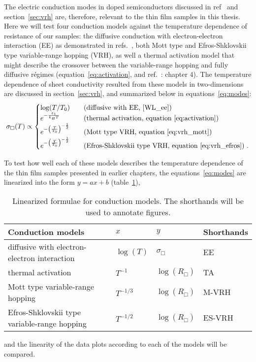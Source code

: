 The electric conduction modes in doped semiconductors discussed in ref~\cite{schklovskii_efros} and section~\ref{sec:vrh} are, therefore, relevant to the thin film samples in this thesis. Here we will test four conduction models against the temperature dependence of resistance of our samples: the diffusive conduction with electron-electron interaction (EE) as demonstrated in refs.~\cite{Chen2011, Liu2011, Roy2013, liao2015}, both Mott type and Efros-Shklovskii type variable-range hopping (VRH), as well a thermal activation model that might describe the crossover between the variable-range hopping and fully diffusive r\'egimes (equation~\ref{eq:activation}, and ref.~\cite{schklovskii_efros}: chapter 4). The temperature dependence of sheet conductivity resulted from these models in two-dimensions are discussed in section~\ref{sec:vrh}, and summarized below in equations~\ref{eq:modes}:%
\begin{equation}\label{eq:modes}
    \sigma_\Box(T) \propto %
    \begin{cases}
        \log(T / T_0)  & \quad \text{(diffusive with EE, \cite{WL_ee})}\\
        e^{-\frac{\varepsilon_1}{k_B T}}   & \quad \text{(thermal activation, equation~\ref{eq:activation})}\\
        e^{-\left(\frac{T}{T_0}\right)^{-\frac{1}{3}}}   & \quad \text{(Mott type VRH, equation~\ref{eq:vrh_mott})}\\
        e^{-\left(\frac{T}{T_0}\right)^{-\frac{1}{2}}} & \quad \text{(Efros-Shklovskii type VRH, equation~\ref{eq:vrh_efros})}~.
    \end{cases}
\end{equation}%

To test how well each of these models describes the temperature dependence of the thin film samples presented in earlier chapters, the equations~\ref{eq:modes} are linearized into the form $y=ax+b$ (table~\ref{tab:models}), %
\begin{table}[ht]
    \centering
    \begin{tabularx}{0.95\columnwidth}[t]{l|l|l|X}
    \caption[Linearized formulae for conduction models]{\label{tab:models}Linearized formulae for conduction models. The shorthands will be used to annotate figures.}\\
		\hline\hline
        Conduction models & $x$ & $y$ & Shorthands\\
        \hline%
        diffusive with electron-electron interaction & $\log(T)$ & $\sigma_\Box$ & EE\\
        thermal activation & $T^{-1}$ & $\log\left(R_\Box\right)$ & TA\\
        Mott type variable-range hopping & $T^{-1/3}$ & $\log\left(R_\Box\right)$ & M-VRH\\
        Efros-Shklovskii type variable-range hopping & $T^{-1/2}$ & $\log\left(R_\Box\right)$ & ES-VRH\\
		\hline\hline
    \end{tabularx}
\end{table}%
%
and the linearity of the data plots according to each of the models will be compared.

